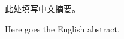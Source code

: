 
\begin{CHSabstract}
	此处填写中文摘要。
\end{CHSabstract}
\begin{ENGabstract}
	Here goes the English abstract.
\end{ENGabstract}
